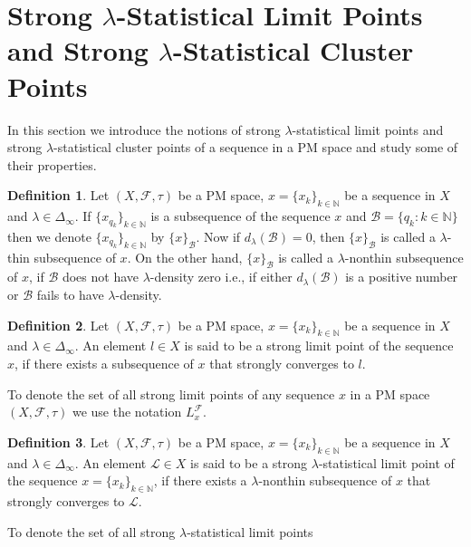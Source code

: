 \documentclass[reqno,b5paper]{amsart}
\theoremstyle{plain}
\theoremstyle{definition}
\newtheorem{defn}{Definition}[section]
\begin{document}
\section{\textbf{Strong $\lambda$-Statistical Limit Points and Strong $\lambda$-Statistical Cluster Points}}

In this section we introduce the notions of strong
$\lambda$-statistical limit points and strong
$\lambda$-statistical cluster points of a sequence in a PM space
and study some of their properties.
\begin{defn}
Let $(X,\mathcal{F},\tau)$ be a PM space, $x=\{x_k\}_{k
\in\mathbb{N}}$ be a sequence in $X$ and
$\lambda\in\Delta_\infty$. If $\{x_{q_k}\}_{k\in\mathbb{N}}$ is a
subsequence of the sequence $x$ and
$\mathcal{B}=\{q_k:k\in\mathbb{N}\}$ then we denote
$\{x_{q_k}\}_{k\in\mathbb{N}}$ by $\{x\}_\mathcal{B}$. Now if
$d_\lambda(\mathcal{B}) = 0$, then $\{x\}_\mathcal{B}$ is called a
$\lambda$-thin subsequence of $x$. On the other hand,
$\{x\}_\mathcal{B}$ is called a $\lambda$-nonthin subsequence of
$x$, if $\mathcal{B}$ does not have $\lambda$-density zero i.e.,
if either $d_\lambda(\mathcal{B})$ is a positive number or
$\mathcal{B}$ fails to have $\lambda$-density.
\end{defn}
\begin{defn}\cite{Se}
Let $(X,\mathcal{F},\tau)$ be a PM space, $x=\{x_k\}_{k
\in\mathbb{N}}$ be a sequence in $X$ and
$\lambda\in\Delta_\infty$. An element $l\in X$ is said to be a
strong limit point of the sequence $x$, if there exists a
subsequence of $x$ that strongly converges to $l$.
\end{defn}
To denote the set of all strong limit points of any sequence $x$
in a PM space $(X,\mathcal{F},\tau)$ we use the notation
$L_x^\mathcal{F}$.
\begin{defn}
Let $(X,\mathcal{F},\tau)$ be a PM space, $x=\{x_k\}_{k
\in\mathbb{N}}$ be a sequence in $X$ and
$\lambda\in\Delta_\infty$. An element $\mathcal{L}\in X$ is said
to be a strong $\lambda$-statistical limit point of the sequence
$x=\{x_k\}_{k\in\mathbb N}$, if there exists a $\lambda$-nonthin
subsequence of $x$ that strongly converges to $\mathcal{L}$.
\end{defn}
To denote the set of all strong $\lambda$-statistical limit points
\end{document}
